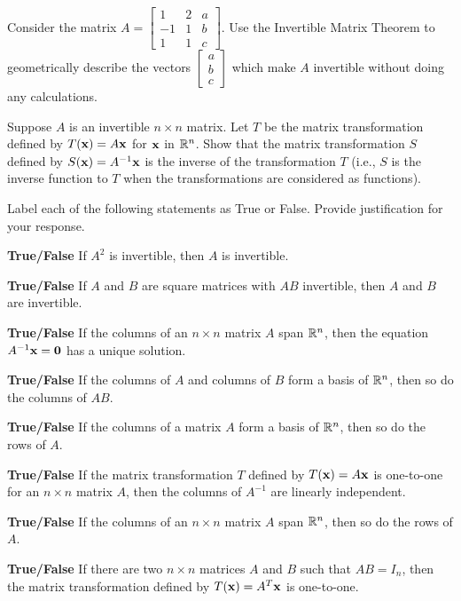 
\be
\item Consider the matrix $A=\left[ \begin{array}{rcc} 1&2&a \\ -1&1&b \\ 1&1&c \end{array} \right]$. Use the Invertible Matrix Theorem to geometrically describe the vectors $\left[ \begin{array}{c} a \\ b\\ c\end{array} \right]$ which make $A$ invertible without doing any calculations.

\item Suppose $A$ is an invertible $n\times n$ matrix. Let $T$ be the matrix transformation defined by $T(\mathbf{x})=A\mathbf{x}$ for $\mathbf{x}$ in $\mathbb{R}^n$. Show that the matrix transformation $S$ defined by $S(\mathbf{x})=A^{-1}\mathbf{x}$ is the inverse of the transformation $T$ (i.e., $S$ is the inverse function to $T$ when the transformations are considered as functions).

\item Label each of the following statements as True or False. Provide justification for your response.
\ba
\item \textbf{True/False} If $A^2$ is invertible, then $A$ is invertible.

\item \textbf{True/False} If $A$ and $B$ are square matrices with $AB$ invertible, then $A$ and $B$ are invertible.

\item \textbf{True/False} If the columns of an $n \times n$ matrix $A$ span $\mathbb{R}^n$, then the equation $A^{-1}\mathbf{x} =\mathbf{0}$ has a unique solution.

\item \textbf{True/False} If the columns of $A$ and columns of $B$ form a basis of $\mathbb{R}^n$, then so do the columns of $AB$.

\item \textbf{True/False} If the columns of a matrix $A$ form a basis of $\mathbb{R}^n$, then so do the rows of $A$.

\item \textbf{True/False} If the matrix transformation $T$ defined by $T(\mathbf{x})=A\mathbf{x}$ is one-to-one for an $n\times n$ matrix $A$, then the columns of $A^{-1}$ are linearly independent.

\item \textbf{True/False} If the columns of an $n\times n$ matrix $A$ span $\mathbb{R}^n$, then so do the rows of $A$.

\item \textbf{True/False} If there are two $n\times n$ matrices $A$ and $B$ such that $AB=I_n$, then the matrix transformation defined by $T(\mathbf{x})=A^T\mathbf{x}$ is one-to-one.

\ea
\ee

